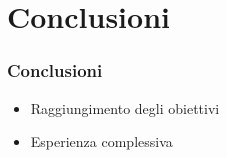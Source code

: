
\section{Conclusioni}
\begin{frame}

  \frametitle{Conclusioni}

  \begin{itemize}
  \item Raggiungimento degli obiettivi
  \item Esperienza complessiva
  \end{itemize}
  
\end{frame}
